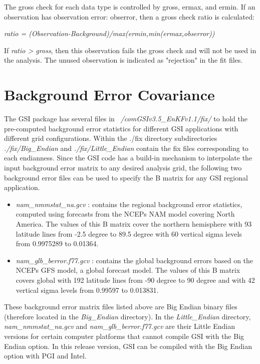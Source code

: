 The gross check for each data type is controlled by gross, ermax, and ermin. If an observation has observation error: obserror, then a gross check ratio is calculated:

\textit{ratio = (Observation-Background)/max(ermin,min(ermax,obserror))}

If \textit{ratio > gross}, then this observation fails the gross check and will not be used in the analysis. The unused observation is indicated as "rejection" in the fit files.

\section{Background Error Covariance}
\label{sec4.8}

The GSI package has several files in \textit{~/comGSIv3.5\_EnKFv1.1/fix/} to hold the pre-computed background error statistics for different GSI applications with different grid configurations. Within the ./fix directory subdirectories \textit{./fix/Big\_Endian} and \textit{./fix/Little\_Endian} contain the fix files corresponding to each endianness. Since the GSI code has a build-in mechanism to interpolate the input background error matrix to any desired analysis grid, the following two background error files can be used to specify the B matrix for any GSI regional application.

\begin{itemize}
\item \textit{nam\_nmmstat\_na.gcv} : contains the regional background error statistics, computed using forecasts from the NCEP\textquotesingle s NAM model covering North America. The values of this B matrix cover the northern hemisphere with 93 latitude lines from -2.5 degree to 89.5 degree with 60 vertical sigma levels from 0.9975289 to 0.01364. 
\item \textit{nam\_glb\_berror.f77.gcv} : contains the global background errors based on the NCEP\textquotesingle s GFS model, a global forecast model. The values of this B matrix covers global with 192 latitude lines from -90 degree to 90 degree and with 42 vertical sigma levels from 0.99597 to 0.013831.
\end{itemize}

These background error matrix files listed above are Big Endian binary files (therefore located in the \textit{Big\_Endian} directory). In the \textit{Little\_Endian} directory, \textit{nam\_nmmstat\_na.gcv} and \textit{nam\_glb\_berror.f77.gcv} are their Little Endian versions for certain computer platforms that cannot compile GSI with the Big Endian option. In this release version, GSI can be compiled with the Big Endian option with PGI and Intel.

